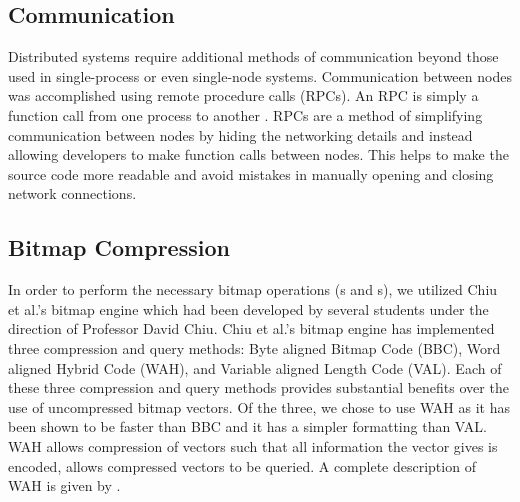 \subsection{Communication}
Distributed systems require additional methods of communication beyond those
used in single-process or even single-node systems. Communication between nodes
was accomplished using remote procedure calls (RPCs). An RPC is simply a
function call from one process to another \cite{tanenbaum1994}. RPCs are a
method of simplifying communication between nodes by hiding the networking
details and instead allowing developers to make function calls between nodes.
This helps to make the source code more readable and avoid mistakes in manually
opening and closing network connections.
%
\subsection{Bitmap Compression}
In order to perform the necessary bitmap operations (s and
s), we utilized Chiu et al.'s bitmap engine which had been developed
by several students under the direction of Professor David Chiu. Chiu et al.'s
bitmap engine has implemented three compression and query methods: Byte aligned
Bitmap Code (BBC), Word aligned Hybrid Code (WAH), and Variable aligned Length
Code (VAL). Each of these three compression and query methods provides
substantial benefits over the use of uncompressed bitmap vectors. Of the three,
we chose to use WAH as it has been shown to be faster than BBC and it has a
simpler formatting than VAL. WAH allows compression of vectors such that all
information the vector gives is encoded, allows compressed vectors to be
queried. A complete description of WAH is given by \cite{wu2001}.
%

